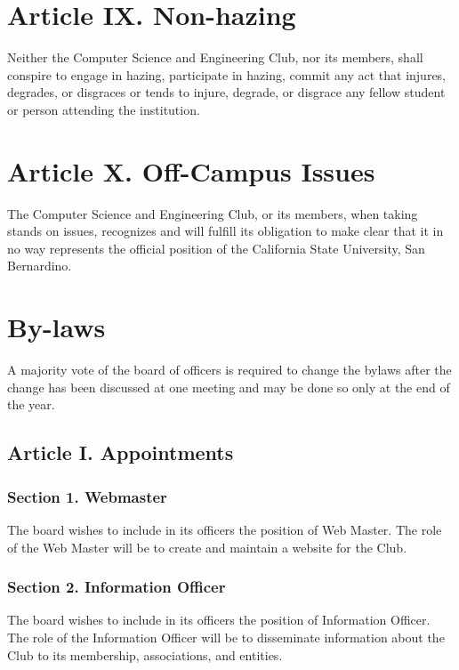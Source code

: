 \documentclass{article}
\begin{document}
\section{Article IX. Non-hazing}
  Neither the Computer Science and Engineering Club, nor its members, shall conspire to engage in hazing, participate in hazing, commit any act that injures, degrades, or disgraces or tends to injure, degrade, or disgrace any fellow student or person attending the institution.

\section{Article X. Off-Campus Issues}
  The Computer Science and Engineering Club, or its members, when taking stands on issues, recognizes and will fulfill its obligation to make clear that it in no way represents the official position of the California State University, San Bernardino.

\section{By-laws}
  A majority vote of the board of officers is required to change the bylaws after the change has been discussed at one meeting and may be done so only at the end of the year.

  \subsection{Article I. Appointments}

    \subsubsection{Section 1. Webmaster}
      The board wishes to include in its officers the position of Web Master. The role of the Web Master will be to create and maintain a website for the Club.

    \subsubsection{Section 2. Information Officer}
      The board wishes to include in its officers the position of Information Officer. The role of the Information Officer will be to disseminate information about the Club to its membership, associations, and entities.
\end{document}
